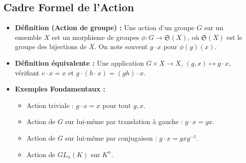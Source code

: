 \documentclass[12pt, a4paper, parskip=full]{report}
\theoremstyle{agregstyle}
\begin{document}
\subsection{Cadre Formel de l'Action}
\begin{itemize}
    \item \textbf{Définition (Action de groupe) :} Une action d'un groupe $G$ sur un ensemble $X$ est un morphisme de groupes $\phi: G \to \mathfrak{S}(X)$, où $\mathfrak{S}(X)$ est le groupe des bijections de $X$. On note souvent $g \cdot x$ pour $\phi(g)(x)$.
    \item \textbf{Définition équivalente :} Une application $G \times X \to X$, $(g,x) \mapsto g \cdot x$, vérifiant $e \cdot x = x$ et $g \cdot (h \cdot x) = (gh) \cdot x$.
    \item \textbf{Exemples Fondamentaux :}
        \begin{itemize}
            \item Action triviale : $g \cdot x = x$ pour tout $g,x$.
            \item Action de $G$ sur lui-même par translation à gauche : $g \cdot x = gx$.
            \item Action de $G$ sur lui-même par conjugaison : $g \cdot x = gxg^{-1}$.
            \item Action de $GL_n(K)$ sur $K^n$.
        \end{itemize}
\end{itemize}
\end{document}
